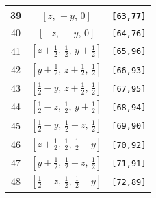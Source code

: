 \documentclass[fleqn,8pt]{jsarticle}
\begin{document}
\begin{longtable}{ccc}
39 & $\left[ z,\, - y,\, 0 \right]$ & {\tt [63,77]} \\ \hline
40 & $\left[ - z,\, - y,\, 0 \right]$ & {\tt [64,76]} \\ \hline
41 & $\left[ z + \frac{1}{2},\, \frac{1}{2},\, y + \frac{1}{2} \right]$ & {\tt [65,96]} \\ \hline
42 & $\left[ y + \frac{1}{2},\, z + \frac{1}{2},\, \frac{1}{2} \right]$ & {\tt [66,93]} \\ \hline
43 & $\left[ \frac{1}{2} - y,\, z + \frac{1}{2},\, \frac{1}{2} \right]$ & {\tt [67,95]} \\ \hline
44 & $\left[ \frac{1}{2} - z,\, \frac{1}{2},\, y + \frac{1}{2} \right]$ & {\tt [68,94]} \\ \hline
45 & $\left[ \frac{1}{2} - y,\, \frac{1}{2} - z,\, \frac{1}{2} \right]$ & {\tt [69,90]} \\ \hline
46 & $\left[ z + \frac{1}{2},\, \frac{1}{2},\, \frac{1}{2} - y \right]$ & {\tt [70,92]} \\ \hline
47 & $\left[ y + \frac{1}{2},\, \frac{1}{2} - z,\, \frac{1}{2} \right]$ & {\tt [71,91]} \\ \hline
48 & $\left[ \frac{1}{2} - z,\, \frac{1}{2},\, \frac{1}{2} - y \right]$ & {\tt [72,89]} \\
\end{longtable}
\renewcommand{\arraystretch}{1.2}
\end{document}
